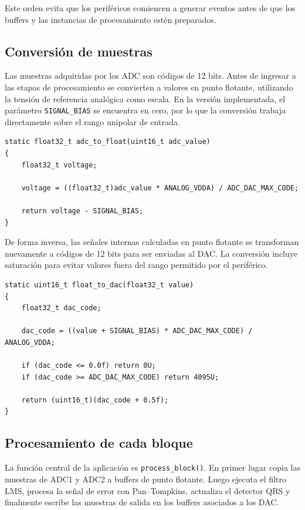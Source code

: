 \documentclass[12pt]{article}
\begin{document}
		Este orden evita que los periféricos comiencen a generar eventos antes de que los buffers y las instancias de procesamiento estén preparados.

		\subsection{Conversión de muestras}

		Las muestras adquiridas por los ADC son códigos de 12 bits. Antes de ingresar a las etapas de procesamiento se convierten a valores en punto flotante, utilizando la tensión de referencia analógica como escala. En la versión implementada, el parámetro \texttt{SIGNAL\_BIAS} se encuentra en cero, por lo que la conversión trabaja directamente sobre el rango unipolar de entrada.

		\begin{lstlisting}[style=mystyle, caption={Conversión de código ADC a punto flotante.}]
static float32_t adc_to_float(uint16_t adc_value)
{
    float32_t voltage;

    voltage = ((float32_t)adc_value * ANALOG_VDDA) / ADC_DAC_MAX_CODE;

    return voltage - SIGNAL_BIAS;
}
		\end{lstlisting}

		De forma inversa, las señales internas calculadas en punto flotante se transforman nuevamente a códigos de 12 bits para ser enviadas al DAC. La conversión incluye saturación para evitar valores fuera del rango permitido por el periférico.

		\begin{lstlisting}[style=mystyle, caption={Conversión de punto flotante a código DAC.}]
static uint16_t float_to_dac(float32_t value)
{
    float32_t dac_code;

    dac_code = ((value + SIGNAL_BIAS) * ADC_DAC_MAX_CODE) / ANALOG_VDDA;

    if (dac_code <= 0.0f) return 0U;
    if (dac_code >= ADC_DAC_MAX_CODE) return 4095U;

    return (uint16_t)(dac_code + 0.5f);
}
		\end{lstlisting}

		\subsection{Procesamiento de cada bloque}

		La función central de la aplicación es \texttt{process\_block()}. En primer lugar copia las muestras de ADC1 y ADC2 a buffers de punto flotante. Luego ejecuta el filtro LMS, procesa la señal de error con Pan--Tompkins, actualiza el detector QRS y finalmente escribe las muestras de salida en los buffers asociados a los DAC.
\end{document}
